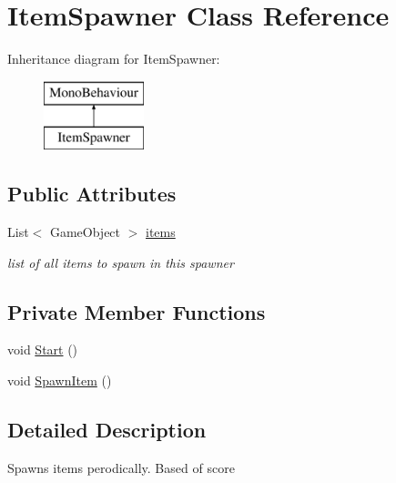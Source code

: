 \hypertarget{class_item_spawner}{}\section{Item\+Spawner Class Reference}
\label{class_item_spawner}
Inheritance diagram for Item\+Spawner\+:\begin{figure}[H]
\begin{center}
\leavevmode
\includegraphics[height=2.000000cm]{class_item_spawner}
\end{center}
\end{figure}
\subsection*{Public Attributes}
\begin{DoxyCompactItemize}
\item 
\mbox{\label{class_item_spawner_a7798ea5cc02f82bbd0828483af3ab744}} 
List$<$ Game\+Object $>$ \hyperlink{class_item_spawner_a7798ea5cc02f82bbd0828483af3ab744}{items}
\begin{DoxyCompactList}\small\item\em list of all items to spawn in this spawner \end{DoxyCompactList}\end{DoxyCompactItemize}
\subsection*{Private Member Functions}
\begin{DoxyCompactItemize}
\item 
void \hyperlink{class_item_spawner_a8747f1740ce252a8676120567abd16e6}{Start} ()
\item 
void \hyperlink{class_item_spawner_a2103c51aae4e7fbf8187e91767b2660c}{Spawn\+Item} ()
\end{DoxyCompactItemize}


\subsection{Detailed Description}
Spawns items perodically. Based of score 

